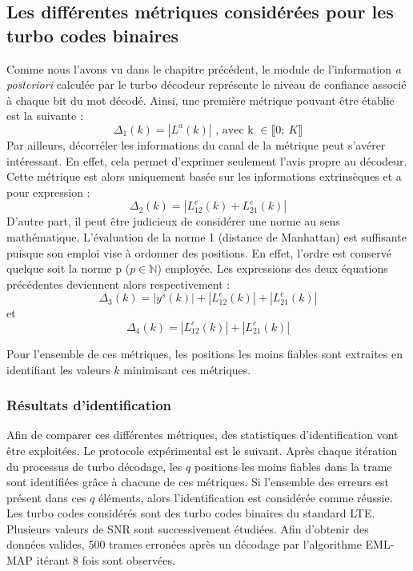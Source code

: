 \subsection{Les différentes métriques considérées pour les turbo codes binaires}
Comme nous l'avons vu dans le chapitre précédent, le module de l'information \textit{a posteriori} calculée par le turbo 
décodeur représente le niveau de confiance associé à chaque bit du mot décodé.
Ainsi, une première métrique pouvant 
être établie est la suivante :
\begin{equation}
	\Delta_1(k) = |L^a(k)|\text{~, avec k~}\in \llbracket0;~K \rrbracket 
\end{equation}
Par ailleurs, décorréler les informations du canal de la métrique peut s'avérer intéressant.
En effet, 
cela permet d'exprimer seulement l'avis propre au décodeur. Cette métrique est alors uniquement basée sur les informations 
extrinsèques et a pour expression : 
\begin{equation}
	\Delta_2(k) = |L^e_{12}(k)+L^e_{21}(k)|
\end{equation}
D'autre part, il peut être judicieux de considérer une norme au sens mathématique. L'évaluation de la norme 1 
(distance de Manhattan) est suffisante puisque son emploi vise à ordonner des positions. En effet, l'ordre est 
conservé quelque soit la norme p ($p \in \mathbb{N} $) employée. Les expressions des deux équations précédentes deviennent 
alors respectivement :
\begin{equation}
	\Delta_3(k) = |y^s(k)| + |L^e_{12}(k)| + |L^e_{21}(k)|
\end{equation}
et 
\begin{equation}
	\Delta_4(k) = |L^e_{12}(k)| + |L^e_{21}(k)|
\end{equation}

Pour l'ensemble de ces métriques, les positions les moins fiables sont extraites en identifiant les valeurs $k$ minimisant
ces métriques.

\subsubsection{Résultats d'identification}
Afin de comparer ces différentes métriques, des statistiques d'identification vont être exploitées. Le protocole 
expérimental est le suivant. Après chaque itération du processus de turbo décodage, les $q$ positions les moins fiables
dans la trame sont identifiées grâce à chacune de ces métriques. Si l'ensemble des erreurs est présent dans ces $q$ éléments,
alors l'identification est considérée comme réussie. Les turbo codes considérés sont des turbo codes binaires du standard LTE.
Plusieurs valeurs de SNR sont successivement étudiées. Afin 
d'obtenir des données valides, 500 trames erronées après un décodage par l'algorithme EML-MAP itérant 8 fois sont
observées.

